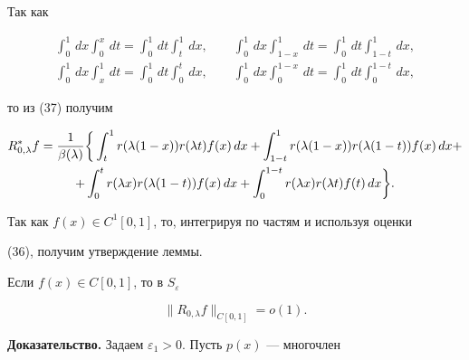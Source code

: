 Так как


\begin{gather*}


\int_{0}^{1}\,dx\int_{0}^{x}\,dt=


\int_{0}^{1}\,dt\int_{t}^{1}\,dx,\qquad


\int_{0}^{1}\,dx\int_{1-x}^{1}\,dt=


\int_{0}^{1}\,dt\int_{1-t}^{1}\,dx,\\


\int_{0}^{1}\,dx\int_{x}^{1}\,dt=


\int_{0}^{1}\,dt\int_{0}^{t}\,dx,\qquad


\int_{0}^{1}\,dx\int_{0}^{1-x}\,dt=


\int_{0}^{1}\,dt\int_{0}^{1-t}\,dx,


\end{gather*}


то из (37) получим


\begin{multline*}


{\di R^*_{0,\lambda}f=\frac1{\beta(\lambda)}\bigg\{


\int_t^1 r(\lambda(1-x))r(\lambda t)f(x)\, dx+


\int_{1-t}^{1}r(\lambda(1-x))r(\lambda(1-t))f(x)\, dx+}\\


{\di+\int_0^t r(\lambda x)r(\lambda(1-t))f(x)\, dx+


\int_0^{1-t} r(\lambda x)r(\lambda t)f(t)\, dx


\bigg\}.}


\end{multline*}


Так как $f(x)\in C^1[0,1]$, то, интегрируя по частям и используя оценки


(36), получим утверждение леммы.





\begin{lem}


Если $f(x)\in C[0,1]$, то в $S_\varepsilon$


$$


\| R_{0,\lambda}f\|_{C[0,1]}=o(1).


$$


\end{lem}





{\bf Доказательство.} Задаем $\varepsilon_1>0$. Пусть $p(x)$ --- многочлен


